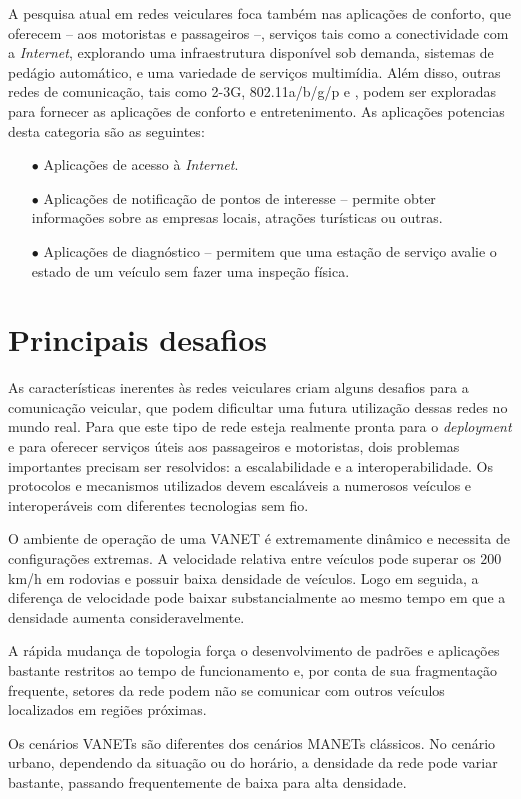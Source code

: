 A pesquisa atual em redes veiculares foca também nas aplicações de conforto,
que oferecem -- aos motoristas e passageiros --, serviços tais como a
conectividade com a \textit{Internet}, explorando uma infraestrutura disponível
sob demanda, sistemas de pedágio automático, e uma variedade de serviços
multimídia. Além disso, outras redes de comunicação, tais como 2-3G,
802.11a/b/g/p e , podem ser exploradas para fornecer as aplicações de conforto e
entretenimento. As aplicações potencias desta categoria são as seguintes:

\begin{enumerate}
 \item[$\bullet$] Aplicações de acesso à \textit{Internet}.
 \item[$\bullet$] Aplicações de notificação de pontos de interesse -- permite
 obter informações sobre as empresas locais, atrações turísticas ou outras.
 \item[$\bullet$] Aplicações de diagnóstico -- permitem que uma estação de
 serviço avalie o estado de um veículo sem fazer uma inspeção física.
\end{enumerate}
 
\section{Principais desafios}
As características inerentes às redes veiculares criam alguns desafios para a
comunicação veicular, que podem dificultar uma futura utilização dessas redes no
mundo real. Para que este tipo de rede esteja realmente pronta para o
\textit{deployment} e para oferecer serviços úteis aos passageiros e
motoristas, dois problemas importantes precisam ser resolvidos: a
escalabilidade e a interoperabilidade. Os protocolos e mecanismos utilizados
devem escaláveis a numerosos veículos e interoperáveis com diferentes
tecnologias sem fio.

O ambiente de operação de uma VANET é extremamente dinâmico e necessita de
configurações extremas. A velocidade relativa entre veículos pode superar os
$200$ km/h em rodovias e possuir baixa densidade de veículos. Logo em seguida, a
diferença de velocidade pode baixar substancialmente ao mesmo tempo em que a
densidade aumenta consideravelmente.

A rápida mudança de topologia força o desenvolvimento de padrões e aplicações
bastante restritos ao tempo de funcionamento e, por conta de sua fragmentação
frequente, setores da rede podem não se comunicar com outros veículos
localizados em regiões próximas.

Os cenários VANETs são diferentes dos cenários MANETs clássicos. No cenário
urbano, dependendo da situação ou do horário, a densidade da rede pode variar
bastante, passando frequentemente de baixa para alta densidade.


